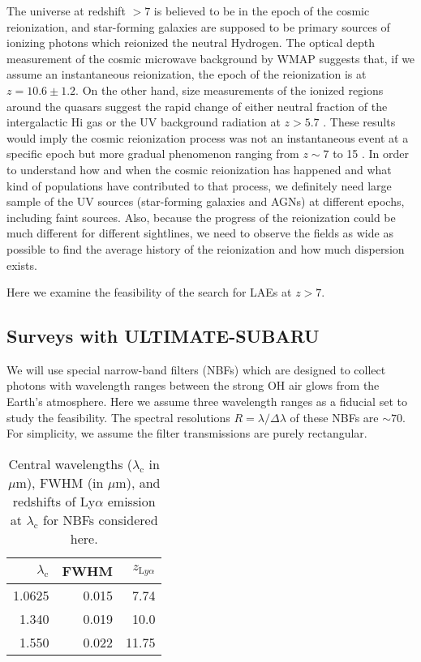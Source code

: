 The universe at redshift $>7$ is believed to be in the epoch of the
cosmic reionization, and star-forming galaxies are supposed to be
primary sources of ionizing photons which reionized the neutral
Hydrogen. The optical depth measurement of the cosmic microwave
background by WMAP suggests that, if we assume an instantaneous
reionization, the epoch of the reionization is at 
$z=10.6\pm 1.2$\citep{Komatsu2011}. On the other hand, size measurements
of the ionized regions around the quasars suggest the rapid change of
either neutral fraction of the intergalactic H{\sc i} gas or the UV
background radiation at $z>5.7$ \citep{Carilli2010,Mortlock2011}. These
results would imply the cosmic reionization process was not
an instantaneous event at a specific epoch  but more gradual phenomenon
ranging from $z\sim7$ to 15 \citep{Trac2007}.
In order to understand how and when the cosmic reionization has happened
and what kind of populations have contributed to that process, we
definitely need large sample of the UV sources (star-forming galaxies
and AGNs) at different epochs, including faint sources. Also, because
the progress of the reionization could be much different for different
sightlines, we need to observe the fields as wide as possible to find
the average history of the reionization and how much dispersion exists.

Here we examine the feasibility of the search for LAEs at $z>7$.

\subsection{Surveys with ULTIMATE-SUBARU}

We will use special narrow-band filters (NBFs) which are designed to
collect photons with wavelength ranges between the strong OH air glows
from the Earth's atmosphere.
Here we assume three wavelength ranges as a fiducial set to study the
feasibility. The spectral resolutions $R = \lambda / \Delta \lambda$
of these NBFs are $\sim 70$. For simplicity, we assume the filter 
transmissions are purely rectangular.

\begin{table}[!ht]
\begin{center}
\begin{tabular}{rrr}
\hline
$\lambda_\mathrm{c}$ & FWHM & $z_{\mathrm Ly\alpha}$\\
\hline
1.0625 & 0.015  &  7.74\\
1.340  & 0.019  & 10.0 \\
1.550  & 0.022  & 11.75\\
\hline
\end{tabular}
\end{center}
\caption{
Central wavelengths ($\lambda_\mathrm{c}$ in $\mu$m), FWHM (in $\mu$m),
 and redshifts of Ly$\alpha$ emission at $\lambda_\mathrm{c}$ for NBFs
 considered here.
}
\label{tab:iwata_nbf_setup}
\end{table}

